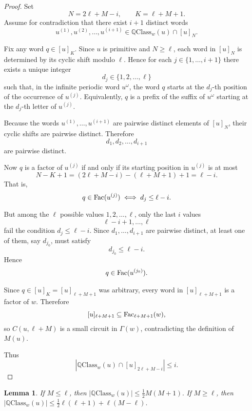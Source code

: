 \documentclass[runningheads,envcountsame,a4paper]{llncs}
\newtheorem{lem}[thm]{Lemma}
\newcommand{\fac}{\hbox{\rm Fac}}
\newcommand{\qcl}{\mathbb{Q}\mathrm{Class}}
\begin{document}
\begin{proof}

Set
\[
N=2\ell+M-i,\qquad K=\ell+M+1.
\]
Assume for contradiction that there exist $i+1$ distinct words
\[
u^{(1)},u^{(2)},\dots,u^{(i+1)} \in \qcl_w(u)\cap [u]_N.
\]

Fix any word $q\in [u]_K$.
Since $u$ is primitive and $N\ge \ell$, each word in $[u]_N$ is determined by its
cyclic shift modulo $\ell$. Hence for each $j\in\{1,\dots,i+1\}$ there exists a unique
integer
\[
d_j\in\{1,2,\dots,\ell\}
\]
such that, in the infinite periodic word $u^\omega$, the word $q$ starts at the
$d_j$-th position of the occurrence of $u^{(j)}$.
Equivalently, $q$ is a prefix of the suffix of $u^\omega$ starting at the $d_j$-th
letter of $u^{(j)}$.

Because the words $u^{(1)},\dots,u^{(i+1)}$ are pairwise distinct elements of $[u]_N$,
their cyclic shifts are pairwise distinct. Therefore
\[
d_1,d_2,\dots,d_{i+1}
\]
are pairwise distinct.

Now $q$ is a factor of $u^{(j)}$ if and only if its starting position in $u^{(j)}$
is at most
\[
N-K+1=(2\ell+M-i)-(\ell+M+1)+1=\ell-i.
\]
That is,
\[
q\in \fac(u^{(j)}) \iff d_j\le \ell-i.
\]

But among the $\ell$ possible values $1,2,\dots,\ell$, only the last $i$ values
\[
\ell-i+1,\dots,\ell
\]
fail the condition $d_j\le \ell-i$. Since $d_1,\dots,d_{i+1}$ are pairwise distinct,
at least one of them, say $d_{j_0}$, must satisfy
\[
d_{j_0}\le \ell-i.
\]
Hence
\[
q\in \fac(u^{(j_0)}).
\]

Since $q\in [u]_K=[u]_{\ell+M+1}$ was arbitrary, every word in $[u]_{\ell+M+1}$ is a
factor of $w$. Therefore
\[
[u]_{\ell+M+1}\subseteq \fac_{\ell+M+1}(w),
\]
so $C(u,\ell+M)$ is a small circuit in $\Gamma(w)$, contradicting the definition of
$M(u)$.

Thus
\[
|\qcl_w(u)\cap [u]_{2\ell+M-i}|\le i.
\]

\end{proof}

%

\begin{lem}\label{estimation of RP for one class}
If $M\le\ell$, then $|\qcl_w(u)|\le \frac12 M(M+1)$. If $M\ge \ell$, then $|\qcl_w(u)|\le \frac12 \ell(\ell+1)+\ell(M-\ell)$.
\end{lem}
\end{document}
